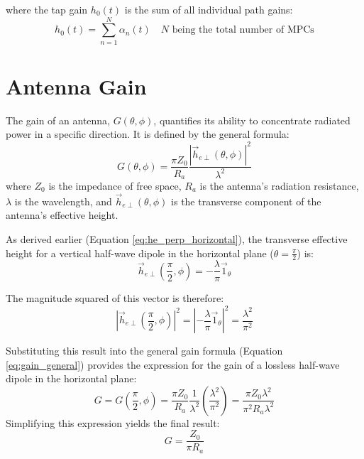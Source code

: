 where the tap gain $h_0(t)$ is the sum of all individual path gains:
\begin{equation}
	\label{eq:narrow}
	\boxed{h_0(t) = \sum_{n=1}^{N} \alpha_n(t)} \quad N \text{ being the total number of MPCs}
\end{equation}


\section{Antenna Gain}
The gain of an antenna, $G(\theta, \phi)$, quantifies its ability to concentrate radiated power in a specific direction. It is defined by the general formula:
\begin{equation}
	G(\theta,\phi) = \frac{\pi Z_0}{R_a} \frac{|\vec{h}_{e\perp}(\theta,\phi)|^2}{\lambda^2}
	\label{eq:gain_general}
\end{equation}
where $Z_0$ is the impedance of free space, $R_a$ is the antenna's radiation resistance, $\lambda$ is the wavelength, and $\vec{h}_{e\perp}(\theta,\phi)$ is the transverse component of the antenna's effective height.

As derived earlier (Equation \ref{eq:he_perp_horizontal}), the transverse effective height for a vertical half-wave dipole in the horizontal plane ($\theta = \frac{\pi}{2}$) is:
\begin{equation}
	\vec{h}_{e\perp}\left(\frac{\pi}{2},\phi\right) = -\frac{\lambda}{\pi}\vec{1}_{\theta}
\end{equation}

The magnitude squared of this vector is therefore:
\begin{equation}
	\left|\vec{h}_{e\perp}\left(\frac{\pi}{2},\phi\right)\right|^2 = \left|-\frac{\lambda}{\pi}\vec{1}_{\theta}\right|^2 = \frac{\lambda^2}{\pi^2}
\end{equation}

Substituting this result into the general gain formula (Equation \ref{eq:gain_general}) provides the expression for the gain of a lossless half-wave dipole in the horizontal plane:
\begin{equation}
	G = G\left(\frac{\pi}{2}, \phi\right) = \frac{\pi Z_0}{R_a} \frac{1}{\lambda^2} \left(\frac{\lambda^2}{\pi^2}\right) = \frac{\pi Z_0 \lambda^2}{\pi^2 R_a \lambda^2}
\end{equation}
Simplifying this expression yields the final result:
\begin{equation}
	G = \frac{Z_0}{\pi R_a}
	\label{eq:gain_derived}
\end{equation}

